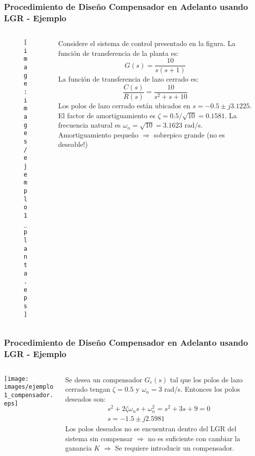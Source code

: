 \documentclass[aspectratio=169,handout]{beamer}
\theoremstyle{definition}
\theoremstyle{plain}
\theoremstyle{remark}
\begin{document}
\begin{frame}[c]\frametitle{Procedimiento de Diseño Compensador en Adelanto usando LGR - Ejemplo}
\vspace*{2mm}
\begin{columns}
	\begin{column}{0.3\textwidth}
	\begin{figure}
		\texttt{[image: images/ejemplo1\_planta.eps]}
	\end{figure}
	\end{column}
	\begin{column}{0.7\textwidth}
		Considere el sistema de control presentado en la figura. La función de transferencia de la planta es:
		\begin{equation*}
			G(s) = \frac{10}{s(s+1)}		
		\end{equation*}
		\pause
		La función de transferencia de lazo cerrado es:
		\begin{equation*}
			\frac{C(s)}{R(s)} = \frac{10}{s^2+s+10}
		\end{equation*}
		\pause
		Los polos de lazo cerrado están ubicados en $s = -0.5 \pm j3.1225$.
		El factor de amortiguamiento es $\zeta = 0.5/\sqrt{10} = 0.1581$.
		La frecuencia natural es $\omega_n = \sqrt{10} = 3.1623$ rad/s.
		Amortiguamiento pequeño $\Rightarrow$ sobrepico grande (no es deseable!)
	\end{column}
\end{columns}
\end{frame}

\begin{frame}[c]\frametitle{Procedimiento de Diseño Compensador en Adelanto usando LGR - Ejemplo}
	\vspace*{5mm}
	\begin{columns}
		\begin{column}{0.4\textwidth}
			\texttt{[image: images/ejemplo1\_compensador.eps]}	
		\end{column}
		\begin{column}{0.6\textwidth}
			Se desea un compensador $G_c(s)$ tal que los polos de lazo cerrado tengan $\zeta = 0.5$ y $\omega_n =3$ rad/s. Entonces los polos deseados son:
			\begin{align*}
				s^2 + 2\zeta \omega_n s + \omega_n^2 = s^2 + 3s + 9 = 0\\
				s = -1.5 \pm j2.5981
		 	\end{align*}
		 	\pause
		 	Los polos deseados no se encuentran dentro del LGR del sistema sin compensar $\Rightarrow$ no es suficiente con cambiar la ganancia $K$ $\Rightarrow$ Se requiere introducir un compensador.
		\end{column}
	\end{columns}
\end{frame}
\end{document}

